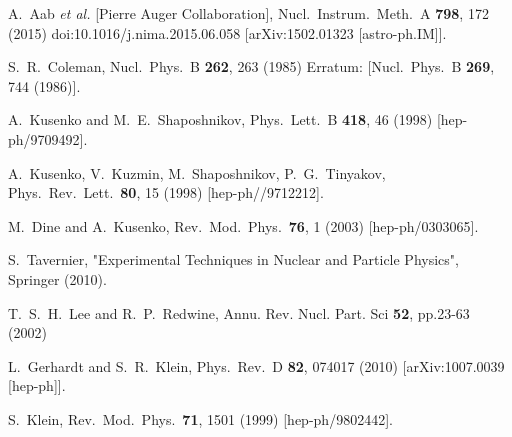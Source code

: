   A.~Aab {\it et al.} [Pierre Auger Collaboration],
  Nucl.\ Instrum.\ Meth.\ A {\bf 798}, 172 (2015)
  doi:10.1016/j.nima.2015.06.058
  [arXiv:1502.01323 [astro-ph.IM]].


  S.~R.~Coleman,
  Nucl.\ Phys.\ B {\bf 262}, 263 (1985)
  Erratum: [Nucl.\ Phys.\ B {\bf 269}, 744 (1986)].


  A.~Kusenko and M.~E.~Shaposhnikov,
  Phys.\ Lett.\ B {\bf 418}, 46 (1998)
  [hep-ph/9709492].


  A.~Kusenko, V.~Kuzmin, M.~Shaposhnikov, P.~G.~Tinyakov,
  Phys.\ Rev.\ Lett.\ {\bf 80}, 15 (1998)
  [hep-ph//9712212].

  M.~Dine and A.~Kusenko,
  Rev.\ Mod.\ Phys.\  {\bf 76}, 1 (2003)
  [hep-ph/0303065].


S.~Tavernier, "Experimental Techniques in Nuclear and Particle Physics", Springer (2010).

T.~S.~H.~Lee and R.~P.~Redwine,
 Annu. Rev. Nucl. Part. Sci {\bf 52}, pp.23-63 (2002)

  L.~Gerhardt and S.~R.~Klein,
  Phys.\ Rev.\ D {\bf 82}, 074017 (2010)
  [arXiv:1007.0039 [hep-ph]].


  S.~Klein,
  Rev.\ Mod.\ Phys.\  {\bf 71}, 1501 (1999)
  [hep-ph/9802442].



